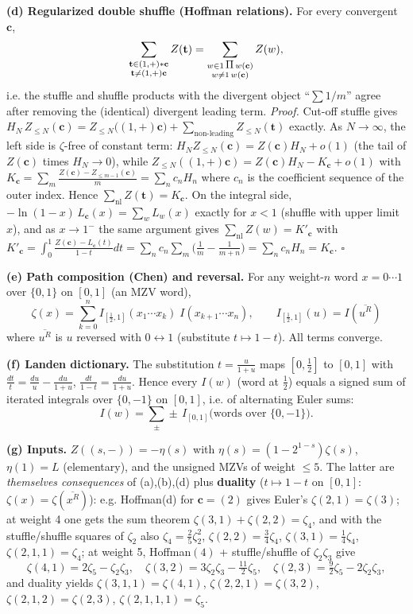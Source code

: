 \documentclass[11pt]{article}
\theoremstyle{remark}
\newcommand{\shuffle}{\mathbin{\rotatebox[origin=c]{180}{\ensuremath{\amalg}}}}
\begin{document}
\textbf{(d) Regularized double shuffle (Hoffman relations).} For every convergent $\mathbf c$,
\[
\sum_{\substack{\mathbf t\in(1,+)\ast\mathbf c\\ \mathbf t\ne (1,+)\mathbf c}}Z(\mathbf t)
=\sum_{\substack{w\in 1\,\shuffle\,w(\mathbf c)\\ w\ne 1\,w(\mathbf c)}}Z(w),
\]
i.e. the stuffle and shuffle products with the divergent object ``$\sum1/m$'' agree after removing the (identical) divergent leading term. \textit{Proof.} Cut-off stuffle gives
$H_N\,Z_{\le N}(\mathbf c)=Z_{\le N}\big((1,+)\mathbf c\big)+\sum_{\text{non-leading}}Z_{\le N}(\mathbf t)$ exactly. As $N\to\infty$, the left side is $\zeta$-free of constant term: $H_N Z_{\le N}(\mathbf c)=Z(\mathbf c)H_N+o(1)$ (the tail of $Z(\mathbf c)$ times $H_N\to0$), while
$Z_{\le N}((1,+)\mathbf c)=Z(\mathbf c)H_N-K_{\mathbf c}+o(1)$ with $K_{\mathbf c}=\sum_m\frac{Z(\mathbf c)-Z_{\le m-1}(\mathbf c)}m=\sum_n c_nH_n$ where $c_n$ is the coefficient sequence of the outer index. Hence $\sum_{\text{nl}}Z(\mathbf t)=K_{\mathbf c}$. On the integral side, $-\ln(1-x)\,L_{\mathbf c}(x)=\sum_w L_w(x)$ exactly for $x<1$ (shuffle with upper limit $x$), and as $x\to1^-$ the same argument gives $\sum_{\text{nl}}Z(w)=K'_{\mathbf c}$ with
$K'_{\mathbf c}=\int_0^1\frac{Z(\mathbf c)-L_{\mathbf c}(t)}{1-t}dt=\sum_nc_n\sum_m\Big(\frac1m-\frac1{m+n}\Big)=\sum_nc_nH_n=K_{\mathbf c}$. $\square$

\textbf{(e) Path composition (Chen) and reversal.} For any weight-$n$ word $x=0\cdots1$ over $\{0,1\}$ on $[0,1]$ (an MZV word),
\[
\zeta(x)=\sum_{k=0}^{n}I_{[\frac12,1]}(x_1\cdots x_k)\;I(x_{k+1}\cdots x_n),\qquad
I_{[\frac12,1]}(u)=I(\overline{u^R})
\]
where $\overline{u^R}$ is $u$ reversed with $0\leftrightarrow1$ (substitute $t\mapsto1-t$). All terms converge.

\textbf{(f) Landen dictionary.} The substitution $t=\frac{u}{1+u}$ maps $[0,\tfrac12]$ to $[0,1]$ with
$\frac{dt}{t}=\frac{du}{u}-\frac{du}{1+u}$, $\frac{dt}{1-t}=\frac{du}{1+u}$. Hence every $I(w)$ (word at $\tfrac12$) equals a signed sum of iterated integrals over $\{0,-1\}$ on $[0,1]$, i.e. of alternating Euler sums:
\[
I(w)=\sum_{\pm}\pm\,I_{[0,1]}\big(\text{words over }\{0,-1\}\big).
\]

\textbf{(g) Inputs.} $Z((s,-))=-\eta(s)$ with $\eta(s)=(1-2^{1-s})\zeta(s)$, $\eta(1)=L$ (elementary), and the unsigned MZVs of weight $\le5$. The latter are \textit{themselves consequences} of (a),(b),(d) plus \textbf{duality} ($t\mapsto1-t$ on $[0,1]$: $\zeta(x)=\zeta(\overline{x^R})$): e.g. Hoffman(d) for $\mathbf c=(2)$ gives Euler's $\zeta(2,1)=\zeta(3)$; at weight 4 one gets the sum theorem $\zeta(3,1)+\zeta(2,2)=\zeta_4$, and with the stuffle/shuffle squares of $\zeta_2$ also $\zeta_4=\tfrac25\zeta_2^2$, $\zeta(2,2)=\tfrac34\zeta_4$, $\zeta(3,1)=\tfrac14\zeta_4$, $\zeta(2,1,1)=\zeta_4$; at weight 5, Hoffman$(4)$ + stuffle/shuffle of $\zeta_2\zeta_3$ give
\[
\zeta(4,1)=2\zeta_5-\zeta_2\zeta_3,\quad \zeta(3,2)=3\zeta_2\zeta_3-\tfrac{11}2\zeta_5,\quad \zeta(2,3)=\tfrac92\zeta_5-2\zeta_2\zeta_3,
\]
and duality yields $\zeta(3,1,1)=\zeta(4,1)$, $\zeta(2,2,1)=\zeta(3,2)$, $\zeta(2,1,2)=\zeta(2,3)$, $\zeta(2,1,1,1)=\zeta_5$.
\end{document}

